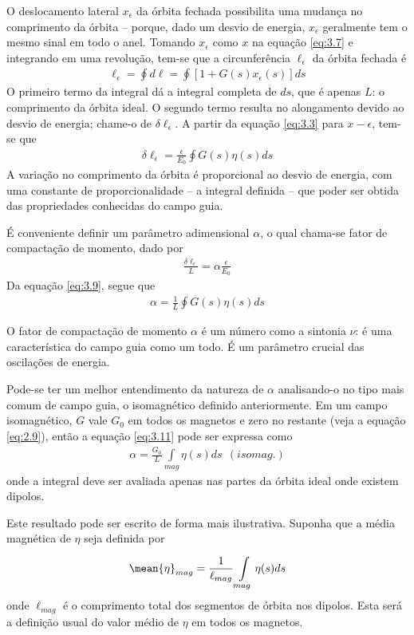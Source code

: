 O deslocamento lateral $x_\epsilon$ da órbita fechada possibilita uma mudança no comprimento da órbita -- porque, dado um desvio de energia, $x_\epsilon$ geralmente tem o mesmo sinal em todo o anel. Tomando $x_\epsilon$ como $x$ na equação \eqref{eq:3.7} e integrando em uma revolução, tem-se que a circunferência $\ell_\epsilon$ da órbita fechada é
\begin{align}
	\ell_\epsilon = \oint d\ell = \oint [1+G(s)x_\epsilon(s)]ds
\end{align}
O primeiro termo da integral dá a integral completa de $ds$, que é apenas $L$: o comprimento da órbita ideal. O segundo termo resulta no alongamento devido ao desvio de energia; chame-o de $\delta \ell_\epsilon$. A partir da equação \eqref{eq:3.3} para $x-\epsilon$, tem-se que
\begin{align}
	\delta \ell_\epsilon = \frac{\epsilon}{E_0} \oint
	 G(s) \eta(s) ds\label{eq:3.9}
\end{align}
A variação no comprimento da órbita é proporcional ao desvio de energia, com uma constante de proporcionalidade --  a integral definida -- que poder ser obtida das propriedades conhecidas do campo guia.

É conveniente definir um parâmetro adimensional $\alpha$, o qual chama-se fator de compactação de momento, dado por
\begin{align}
	\frac{\delta \ell_\epsilon}{L} = \alpha \frac{\epsilon}{E_0}
\end{align}
Da equação \eqref{eq:3.9}, segue que
\begin{align}
	\alpha = \frac{1}{L} \oint G(s) \eta(s) ds\label{eq:3.11}
\end{align}

O fator de compactação de momento $\alpha$ é um número como a sintonia $\nu$: é uma característica do campo guia como um todo. É um parâmetro crucial das oscilações de energia.

Pode-se ter um melhor entendimento da natureza de $\alpha$ analisando-o no tipo mais comum de campo guia, o isomagnético definido anteriormente. Em um campo isomagnético, $G$ vale $G_0$ em todos os magnetos e zero no restante (veja a equação \eqref{eq:2.9}), então a equação \eqref{eq:3.11} pode ser expressa como
\begin{align}
	\alpha = \frac{G_0}{L} \int\limits_{mag}^{} \eta(s) ds\ \ (isomag.)
\end{align}
onde a integral deve ser avaliada apenas nas partes da órbita ideal onde existem dipolos.

Este resultado pode ser escrito de forma mais ilustrativa. Suponha que a média magnética de $\eta$ seja definida por
\begin{align}
	\mean{\eta}_{mag} = \frac{1}{\ell_{mag}}\int\limits_{mag}^{}\eta(s)ds\label{eq:3.13}
\end{align}
onde $\ell_{mag}$ é o comprimento total dos segmentos de órbita nos dipolos. Esta será a definição usual do valor médio de $\eta$ em todos os magnetos.

